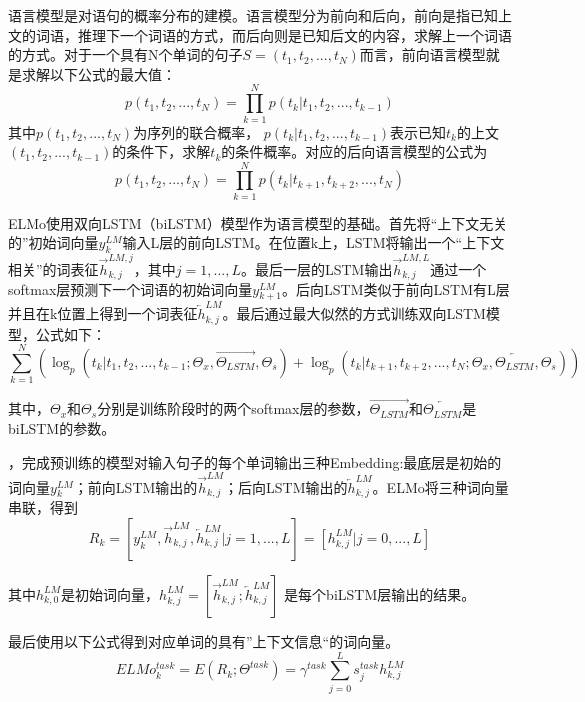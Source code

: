 语言模型是对语句的概率分布的建模。语言模型分为前向和后向，前向是指已知上文的词语，推理下一个词语的方式，而后向则是已知后文的内容，求解上一个词语的方式。对于一个具有N个单词的句子$S=(t_1, t_2, ..., t_N)$而言，前向语言模型就是求解以下公式的最大值：
\begin{equation}
p(t_1, t_2, ..., t_N)=\prod_{k=1}^N p(t_k|t_1,t_2,...,t_{k-1})
\end{equation}
其中$p(t_1, t_2, ..., t_N)$为序列的联合概率，
$p(t_k|t_1, t_2,..., t_{k-1})$表示已知$t_k$的上文$(t_1, t_2, ..., t_{k-1})$的条件下，求解$t_k$的条件概率。对应的后向语言模型的公式为
\begin{equation}
p(t_1, t_2, ..., t_N)=\prod_{k=1}^N p(t_k|t_{k+1},t_{k+2},...,t_N)
\end{equation}

ELMo使用双向LSTM（biLSTM）模型作为语言模型的基础。首先将“上下文无关的”初始词向量$y{_k^{LM}}$输入L层的前向LSTM。在位置k上，LSTM将输出一个“上下文相关”的词表征$\vec{h}_{k,j}^{LM,j}$，其中$j = 1, ..., L$。最后一层的LSTM输出$\vec{h}_{k,j}^{LM,L}$通过一个softmax层预测下一个词语的初始词向量$y{_{k+1}^{LM}}$。后向LSTM类似于前向LSTM有L层并且在k位置上得到一个词表征$\overleftarrow{h}_{k,j}^{LM}$。最后通过最大似然的方式训练双向LSTM模型，公式如下：
\begin{equation}
\sum_{k=1}^N(\log_p(t_k|t_1, t_2,..., t_{k-1};\Theta_x,\overrightarrow{\Theta_{LSTM}},\Theta_s) + \log_p(t_k|t_{k+1},t_{k+2},...,t_N;\Theta_x,\overleftarrow{\Theta_{LSTM}},\Theta_s)
)
\end{equation}

其中，$\Theta_x$和$\Theta_s$分别是训练阶段时的两个softmax层的参数，$\overrightarrow{\Theta_{LSTM}}$和$\overleftarrow{\Theta_{LSTM}}$是biLSTM的参数。

，完成预训练的模型对输入句子的每个单词输出三种Embedding:最底层是初始的词向量$y{_k^{LM}}$；前向LSTM输出的$\overrightarrow{h}_{k,j}^{LM}$；后向LSTM输出的$\overleftarrow{h}_{k,j}^{LM}$。ELMo将三种词向量串联，得到
\begin{equation}
R_k = 
[y_k^{LM}, \overrightarrow{h}_{k,j}^{LM}, \overleftarrow{h}_{k,j}^{LM} | j = 1, ..., L]
= [h_{k,j}^{LM} | j = 0, ..., L]
\end{equation}

其中$h_{k,0}^{LM}$是初始词向量，$h_{k,j}^{LM} = [\overrightarrow{h}_{k,j}^{LM}; \overleftarrow{h}_{k,j}^{LM}]$ 是每个biLSTM层输出的结果。

最后使用以下公式得到对应单词的具有”上下文信息“的词向量。
\begin{equation}
ELMo_k^{task} = E(R_k; \Theta^{task}) = \gamma^{task}\sum_{j=0}^L s_j^{task} h_{k,j}^{LM}
\end{equation}

